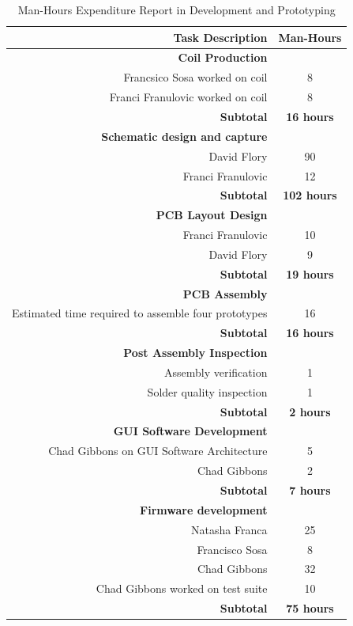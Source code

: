 \documentclass[12pt]{article}
\begin{document}
\begin{table}[h!]
\centering
\caption{Man-Hours Expenditure Report in Development and Prototyping}
\begin{tabular}{ | r | c | }
\hline
\hline
Task Description & Man-Hours \\
\hline
\hline
\hline
\textbf{Coil Production} & \\
\hline
Francsico Sosa worked on coil & 8 \\
\hline
Franci Franulovic worked on coil & 8 \\
\textbf{Subtotal} & \textbf{16 hours}\\
\hline
\hline
\textbf{Schematic design and capture} & \\ 
\hline
 David Flory & 90  \\
 \hline
 Franci Franulovic  & 12 \\
 \hline
\textbf{Subtotal} & \textbf{102 hours}\\
\hline
\hline
\textbf{PCB Layout Design} & \\
 \hline
Franci Franulovic & 10\\
 \hline
David Flory & 9 \\
 \hline
\textbf{Subtotal} & \textbf{19 hours}\\
\hline
\hline
\textbf{PCB Assembly} & \\
 \hline
Estimated time required to assemble four prototypes & 16 \\
 \hline
\textbf{Subtotal} & \textbf{16 hours}\\
\hline
\hline
\textbf{Post Assembly Inspection } & \\
 \hline
Assembly verification & 1 \\
 \hline
Solder quality inspection & 1 \\
 \hline
\textbf{Subtotal} & \textbf{2 hours}\\
\hline
\hline
\textbf{GUI Software Development} & \\
 \hline
Chad Gibbons on GUI Software Architecture & 5\\
 \hline
Chad Gibbons & 2 \\
 \hline
\textbf{ Subtotal} & \textbf{7 hours}\\
\hline
\hline
\textbf{Firmware development } & \\
 \hline
Natasha Franca & 25\\
 \hline
 Francisco Sosa & 8\\
 \hline
 Chad Gibbons & 32\\
 \hline
Chad Gibbons worked on test suite & 10\\
 \hline
\textbf{Subtotal} & \textbf{75 hours}\\
\hline
\end{tabular}
\end{table}
\end{document}

